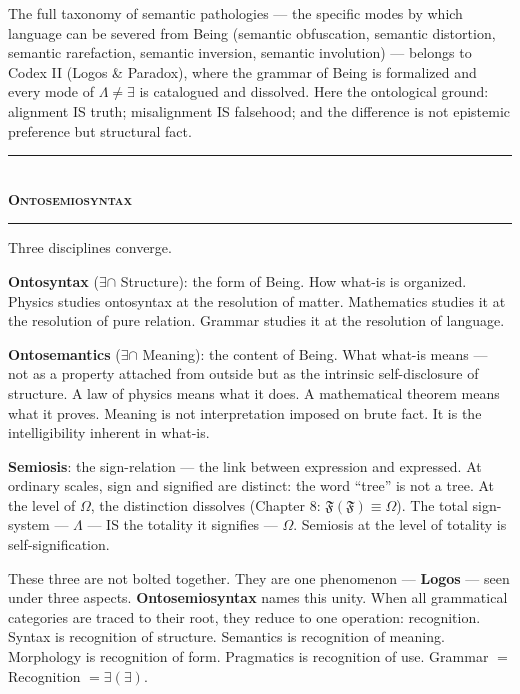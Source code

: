 \documentclass[10pt, openany, oneside]{book}
\renewcommand{\normalsize}{\fontsize{10}{13}\selectfont}
\begin{document}
The full taxonomy of semantic pathologies --- the specific modes by which language can be severed from Being (semantic obfuscation, semantic distortion, semantic rarefaction, semantic inversion, semantic involution) --- belongs to Codex II (Logos \& Paradox), where the grammar of Being is formalized and every mode of $\Lambda \neq \exists$ is catalogued and dissolved. Here the ontological ground: alignment IS truth; misalignment IS falsehood; and the difference is not epistemic preference but structural fact.

\vspace{1.5em}


\begin{center}
    \rule{0.3\textwidth}{0.4pt}\\[0.5em]
    {\normalsize\bfseries\scshape Ontosemiosyntax}\\[0.3em]
    \rule{0.3\textwidth}{0.4pt}
\end{center}

\vspace{1em}

\noindent Three disciplines converge.

\textbf{Ontosyntax} ($\exists \cap$ Structure): the form of Being. How what-is is organized. Physics studies ontosyntax at the resolution of matter. Mathematics studies it at the resolution of pure relation. Grammar studies it at the resolution of language.

\textbf{Ontosemantics} ($\exists \cap$ Meaning): the content of Being. What what-is means --- not as a property attached from outside but as the intrinsic self-disclosure of structure. A law of physics means what it does. A mathematical theorem means what it proves. Meaning is not interpretation imposed on brute fact. It is the intelligibility inherent in what-is.

\textbf{Semiosis}: the sign-relation --- the link between expression and expressed. At ordinary scales, sign and signified are distinct: the word ``tree'' is not a tree. At the level of $\Omega$, the distinction dissolves (Chapter 8: $\mathfrak{F}(\mathfrak{F}) \equiv \Omega$). The total sign-system --- $\Lambda$ --- IS the totality it signifies --- $\Omega$. Semiosis at the level of totality is self-signification.

These three are not bolted together. They are one phenomenon --- \textbf{Logos} --- seen under three aspects. \textbf{Ontosemiosyntax} names this unity. When all grammatical categories are traced to their root, they reduce to one operation: recognition. Syntax is recognition of structure. Semantics is recognition of meaning. Morphology is recognition of form. Pragmatics is recognition of use. Grammar $=$ Recognition $= \exists(\exists)$.
\end{document}
